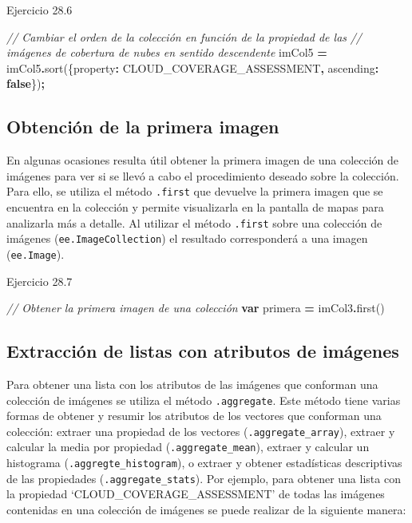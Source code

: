 \documentclass[
  12pt,
  letterpaper,
  twoside]{book}
\newenvironment{Shaded}{\begin{snugshade}}{\end{snugshade}}
\newcommand{\CommentTok}[1]{\textcolor[rgb]{0.56,0.35,0.01}{\textit{#1}}}
\newcommand{\DataTypeTok}[1]{\textcolor[rgb]{0.13,0.29,0.53}{#1}}
\newcommand{\FunctionTok}[1]{\textcolor[rgb]{0.00,0.00,0.00}{#1}}
\newcommand{\KeywordTok}[1]{\textcolor[rgb]{0.13,0.29,0.53}{\textbf{#1}}}
\newcommand{\NormalTok}[1]{#1}
\newcommand{\OperatorTok}[1]{\textcolor[rgb]{0.81,0.36,0.00}{\textbf{#1}}}
\newcommand{\StringTok}[1]{\textcolor[rgb]{0.31,0.60,0.02}{#1}}
\begin{document}
Ejercicio 28.6

\begin{Shaded}
\begin{Highlighting}[]
\CommentTok{// Cambiar el orden de la colección en función de la propiedad de las }
\CommentTok{// imágenes de cobertura de nubes en sentido descendente}
\NormalTok{imCol5 }\OperatorTok{=}\NormalTok{ imCol5}\OperatorTok{.}\FunctionTok{sort}\NormalTok{(\{}\DataTypeTok{property}\OperatorTok{:} \StringTok{\textquotesingle{}CLOUD\_COVERAGE\_ASSESSMENT\textquotesingle{}}\OperatorTok{,} 
  \DataTypeTok{ascending}\OperatorTok{:} \KeywordTok{false}\NormalTok{\})}\OperatorTok{;}
\end{Highlighting}
\end{Shaded}

\hypertarget{obtenciuxf3n-de-la-primera-imagen}{%
\subsection{Obtención de la primera imagen}\label{obtenciuxf3n-de-la-primera-imagen}}

En algunas ocasiones resulta útil obtener la primera imagen de una colección de imágenes para ver si se llevó a cabo el procedimiento deseado sobre la colección. Para ello, se utiliza el método \texttt{.first} que devuelve la primera imagen que se encuentra en la colección y permite visualizarla en la pantalla de mapas para analizarla más a detalle. Al utilizar el método \texttt{.first} sobre una colección de imágenes (\texttt{ee.ImageCollection}) el resultado corresponderá a una imagen (\texttt{ee.Image}).

Ejercicio 28.7

\begin{Shaded}
\begin{Highlighting}[]
\CommentTok{// Obtener la primera imagen de una colección}
\KeywordTok{var}\NormalTok{ primera }\OperatorTok{=}\NormalTok{ imCol3}\OperatorTok{.}\FunctionTok{first}\NormalTok{()}
\end{Highlighting}
\end{Shaded}

\hypertarget{extracciuxf3n-de-listas-con-atributos-de-imuxe1genes}{%
\subsection{Extracción de listas con atributos de imágenes}\label{extracciuxf3n-de-listas-con-atributos-de-imuxe1genes}}

Para obtener una lista con los atributos de las imágenes que conforman una colección de imágenes se utiliza el método \texttt{.aggregate}. Este método tiene varias formas de obtener y resumir los atributos de los vectores que conforman una colección: extraer una propiedad de los vectores (\texttt{.aggregate\_array}), extraer y calcular la media por propiedad (\texttt{.aggregate\_mean}), extraer y calcular un histograma (\texttt{.aggregte\_histogram}), o extraer y obtener estadísticas descriptivas de las propiedades (\texttt{.aggregate\_stats}). Por ejemplo, para obtener una lista con la propiedad `CLOUD\_COVERAGE\_ASSESSMENT' de todas las imágenes contenidas en una colección de imágenes se puede realizar de la siguiente manera:
\end{document}
